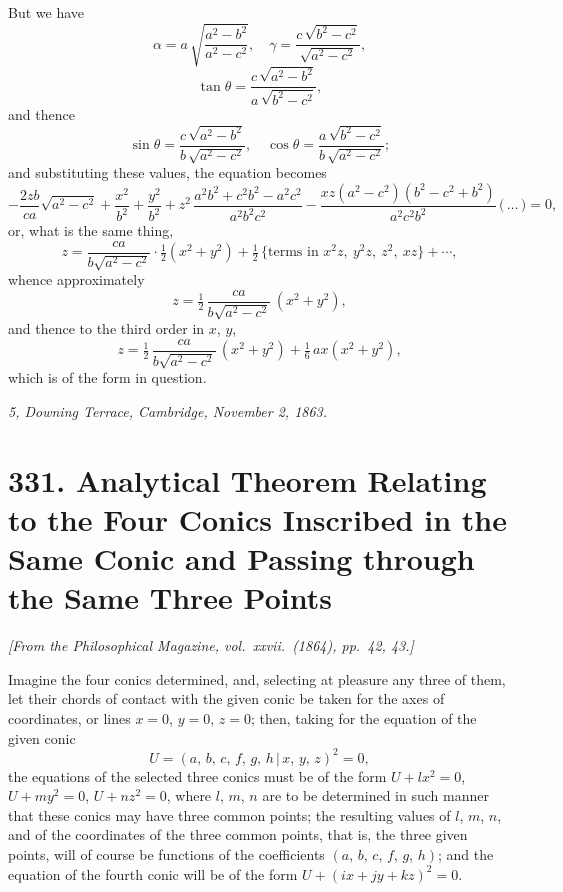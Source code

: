 \documentclass[11pt,a4paper]{article}
\providecommand{\mid}{\,|\,}
\theoremstyle{plain}
\begin{document}
But we have
\[
\alpha = a\,\sqrt{\frac{a^2 - b^2}{a^2 - c^2}},\quad \gamma = \frac{c\,\sqrt{b^2 - c^2}}{\sqrt{a^2 - c^2}},
\]
\[
\tan\theta = \frac{c\,\sqrt{a^2 - b^2}}{a\,\sqrt{b^2 - c^2}},
\]
and thence
\[
\sin\theta = \frac{c\,\sqrt{a^2 - b^2}}{b\,\sqrt{a^2 - c^2}},\quad \cos\theta = \frac{a\,\sqrt{b^2 - c^2}}{b\,\sqrt{a^2 - c^2}};
\]
and substituting these values, the equation becomes
\[
-\frac{2zb}{ca}\sqrt{a^2 - c^2} + \frac{x^2}{b^2} + \frac{y^2}{b^2} + z^2\,\frac{a^2 b^2 + c^2 b^2 - a^2 c^2}{a^2 b^2 c^2} - \frac{xz(a^2 - c^2)(b^2 - c^2 + b^2)}{a^2 c^2 b^2}\,\bigl(\,\ldots\,\bigr) = 0,
\]
or, what is the same thing,
\[
z = \frac{ca}{b\sqrt{a^2 - c^2}}\cdot\tfrac{1}{2}(x^2 + y^2) + \tfrac{1}{2}\,\bigl\{\text{terms in } x^2 z,\ y^2 z,\ z^2,\ xz\bigr\} + \cdots,
\]
whence approximately
\[
z = \tfrac{1}{2}\,\frac{ca}{b\sqrt{a^2 - c^2}}\,(x^2 + y^2),
\]
and thence to the third order in $x$, $y$,
\[
z = \tfrac{1}{2}\,\frac{ca}{b\sqrt{a^2 - c^2}}\,(x^2 + y^2) + \tfrac{1}{6}\,a x(x^2 + y^2),
\]
which is of the form in question.

\medskip
\noindent\textit{5, Downing Terrace, Cambridge, November 2, 1863.}

\newpage
\section*{331. Analytical Theorem Relating to the Four Conics Inscribed in the Same Conic and Passing through the Same Three Points}

\noindent\textit{[From the Philosophical Magazine, vol.\ xxvii.\ (1864), pp.\ 42, 43.]}

\medskip

Imagine the four conics determined, and, selecting at pleasure any three of them, let their chords of contact with the given conic be taken for the axes of coordinates, or lines $x = 0$, $y = 0$, $z = 0$; then, taking for the equation of the given conic
\[
U = (a,\,b,\,c,\,f,\,g,\,h \mid x,\,y,\,z)^2 = 0,
\]
the equations of the selected three conics must be of the form $U + l x^2 = 0$, $U + m y^2 = 0$, $U + n z^2 = 0$, where $l$, $m$, $n$ are to be determined in such manner that these conics may have three common points; the resulting values of $l$, $m$, $n$, and of the coordinates of the three common points, that is, the three given points, will of course be functions of the coefficients $(a,\,b,\,c,\,f,\,g,\,h)$; and the equation of the fourth conic will be of the form $U + (i x + j y + k z)^2 = 0$.
\end{document}
